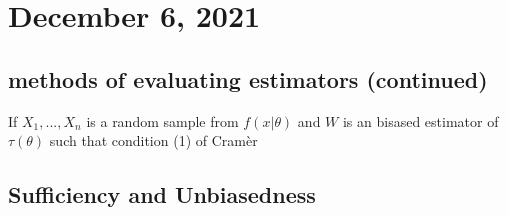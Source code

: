 \section{December 6, 2021}
\subsection{methods of evaluating estimators (continued)}
\begin{corollary}
    If $X_1,...,X_n$ is a random sample from $f(x|\theta)$ and $W$ is an bisased estimator of $\tau(\theta)$ such that condition (1) of Cram\`er
\end{corollary}
\subsection{Sufficiency and Unbiasedness}